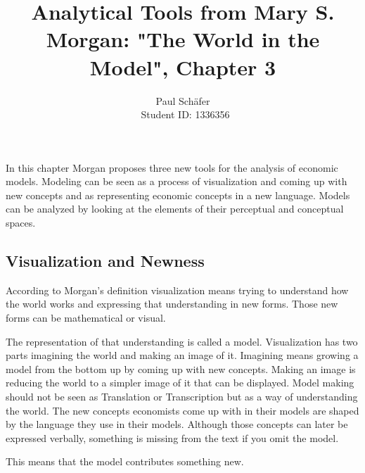 \documentclass[a4paper, 12pt]{article}
\author{Paul Sch\"afer \\\ Student ID: 1336356}
\begin{document}
\title{Analytical Tools from Mary S. Morgan: "The World in the Model", Chapter 3}
\maketitle
In this chapter Morgan proposes three new tools for the analysis of economic models. Modeling can be seen as a process of visualization and coming up with new concepts and as representing economic concepts in a new language. Models can be analyzed by looking at the elements of their perceptual and conceptual spaces.

\subsection*{Visualization and Newness}
According to Morgan's definition visualization means trying to understand how the world works and expressing that understanding in new forms. Those new forms can be mathematical or visual. \begin{comment} Das ist Tautologie: Eine Visualisierung kann visuell sein. \end{comment} The representation of that understanding is called a model. Visualization has two parts imagining the world and making an image of it. Imagining means growing a model from the bottom up by coming up with new concepts. Making an image is reducing the world to a simpler image of it that can be displayed. Model making should not be seen as Translation or Transcription but as a way of understanding the world. The new concepts economists come up with in their models are shaped by the language they use in their models. Although those concepts can later be expressed verbally, something is missing from the text if you omit the model. \begin{comment} Ich bin mir nicht sicher, ob ich diesen Satz verstanden habe. Wenn man das Modell weglässt ist auch manches vom Text weg, das das Konzept beschreibt, welches wiederum neu geschaffen wurde für das Modell? \end{comment} This means that the model contributes something new.
\end{document}
